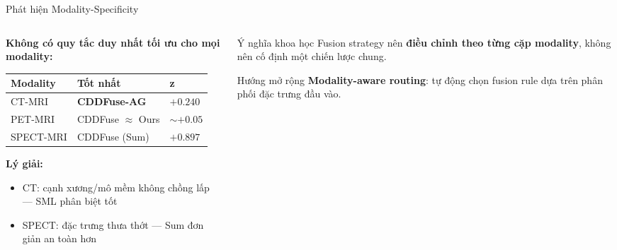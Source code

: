 \documentclass[t, aspectratio=169]{beamer}
\begin{document}
\begin{frame}{Phát hiện Modality-Specificity}
    \begin{columns}[T]
        \begin{column}{0.48\textwidth}
            \textbf{Không có quy tắc duy nhất tối ưu cho mọi modality:}
            \vspace{0.3em}
            \small
            \begin{tabular}{lll}
                \toprule
                \textbf{Modality} & \textbf{Tốt nhất} & \textbf{z} \\
                \midrule
                CT-MRI    & \textbf{CDDFuse-AG} & $+0.240$ \\
                PET-MRI   & CDDFuse $\approx$ Ours & $\sim+0.05$ \\
                SPECT-MRI & CDDFuse (Sum) & $+0.897$ \\
                \bottomrule
            \end{tabular}
            \vspace{0.4em}
            \small\textbf{Lý giải:}
            \begin{itemize}
                \item CT: cạnh xương/mô mềm không chồng lấp --- SML phân biệt tốt
                \item SPECT: đặc trưng thưa thớt --- Sum đơn giản an toàn hơn
            \end{itemize}
        \end{column}
        \begin{column}{0.48\textwidth}
            \begin{alertblock}{Ý nghĩa khoa học}
                Fusion strategy nên \textbf{điều chỉnh theo từng cặp modality}, không nên cố định một chiến lược chung.
            \end{alertblock}
            \vspace{0.4em}
            \begin{block}{Hướng mở rộng}
                \textbf{Modality-aware routing}: tự động chọn fusion rule dựa trên phân phối đặc trưng đầu vào.
            \end{block}
        \end{column}
    \end{columns}
\end{frame}
\end{document}
